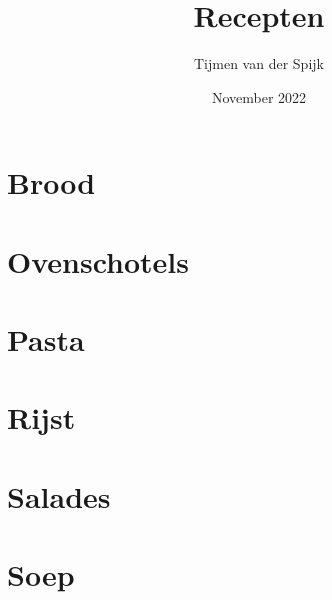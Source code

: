 \documentclass[12pt]{article}
\title{Recepten}
\author{Tijmen van der Spijk}
\date{November 2022}
\begin{document}
\maketitle
\tableofcontents
\pagebreak

\section{Brood}
\pagebreak

\section{Ovenschotels}

\pagebreak

\section{Pasta}

\pagebreak

\pagebreak

\pagebreak

\pagebreak

\pagebreak

\section{Rijst}

\pagebreak

\pagebreak

\pagebreak

\pagebreak

\section{Salades}

\pagebreak

\pagebreak

\pagebreak

\section{Soep}

\pagebreak

\pagebreak
\end{document}
